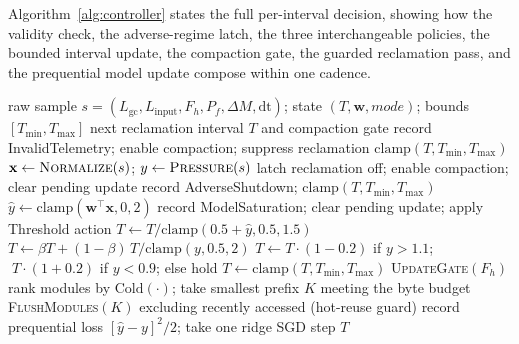 Algorithm~\ref{alg:controller} states the full per-interval decision, showing
how the validity check, the adverse-regime latch, the three interchangeable
policies, the bounded interval update, the compaction gate, the guarded
reclamation pass, and the prequential model update compose within one cadence.

\begin{algorithm}[t]
\caption{SAGE-MM controller decision for one interval. Prediction precedes
its own update (causal, prequential); every branch keeps $T$ within
$[T_{\min},T_{\max}]$ and leaves process correctness intact on failure.}
\label{alg:controller}
\small
\begin{algorithmic}[1]
\Require raw sample $s=(L_{\mathrm{gc}},L_{\mathrm{input}},F_h,P_f,\Delta M,\mathrm{dt})$; state
$(T,\mathbf{w},\textit{mode})$; bounds $[T_{\min},T_{\max}]$
\Ensure next reclamation interval $T$ and compaction gate
  \State record \textsf{InvalidTelemetry}; enable compaction; suppress reclamation
  \State \Return $\mathrm{clamp}(T,T_{\min},T_{\max})$ 
\EndIf
\State $\mathbf{x}\gets\textsc{Normalize}(s)$; \quad $y\gets\textsc{Pressure}(s)$ 
  \State latch reclamation off; enable compaction; clear pending update
  \State record \textsf{AdverseShutdown}; \Return $\mathrm{clamp}(T,T_{\min},T_{\max})$
\EndIf
{}
  \State $\hat{y}\gets\mathrm{clamp}(\mathbf{w}^{\!\top}\mathbf{x},0,2)$
    \State record \textsf{ModelSaturation}; clear pending update; apply \textsf{Threshold} action
  \Else
    \State $T\gets T/\mathrm{clamp}(0.5+\hat{y},0.5,1.5)$
  \EndIf
{}
  \State $T\gets \beta T+(1-\beta)\,T/\mathrm{clamp}(y,0.5,2)$
  \State $T\gets T\cdot(1-0.2)$ if $y>1.1$; $\;T\cdot(1+0.2)$ if $y<0.9$; else hold
\EndIf
\State $T\gets\mathrm{clamp}(T,T_{\min},T_{\max})$
\State \textsc{UpdateGate}$(F_h)$ 
  \State rank modules by $\mathrm{Cold}(\cdot)$; take smallest prefix $K$ meeting the byte budget
  \State \textsc{FlushModules}$(K)$ excluding recently accessed (hot-reuse guard)
\EndIf
{}
  \State record prequential loss $[\hat{y}-y]^2/2$; take one ridge SGD step 
\EndIf
\State \Return $T$
\end{algorithmic}
\end{algorithm}

